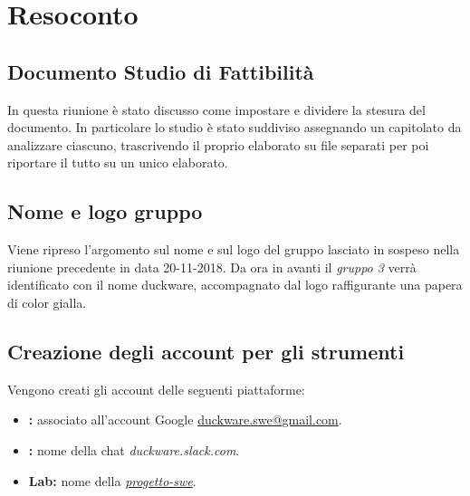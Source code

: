 \clearpage
\section{Resoconto}
	\subsection{Documento Studio di Fattibilità}
	In questa riunione è stato discusso come impostare e dividere la stesura del documento. In particolare lo studio è stato suddiviso assegnando un capitolato da analizzare ciascuno, trascrivendo il proprio elaborato su file separati per poi riportare il tutto su un unico elaborato. 
	
	\subsection{Nome e logo gruppo}
	Viene ripreso l'argomento sul nome e sul logo del gruppo lasciato in sospeso nella riunione precedente in data 20-11-2018.
	Da ora in avanti il \emph{gruppo 3} verrà identificato con il nome duckware, accompagnato dal logo raffigurante una papera di color gialla.
	
	\subsection{Creazione degli account per gli strumenti}
	Vengono creati gli account delle seguenti piattaforme:
	\begin{itemize}
		\item \textbf{:} associato all'account Google \href{mailto:duckware.swe@gmail.com} {duckware.swe@gmail.com}.
		\item \textbf{:} nome della chat \emph{duckware.slack.com}.
		\item \textbf{Lab:} nome della   \href{https://gitlab.com/AlessandroPegoraro/progetto-swe}{\emph{progetto-swe}}.
	\end{itemize}
